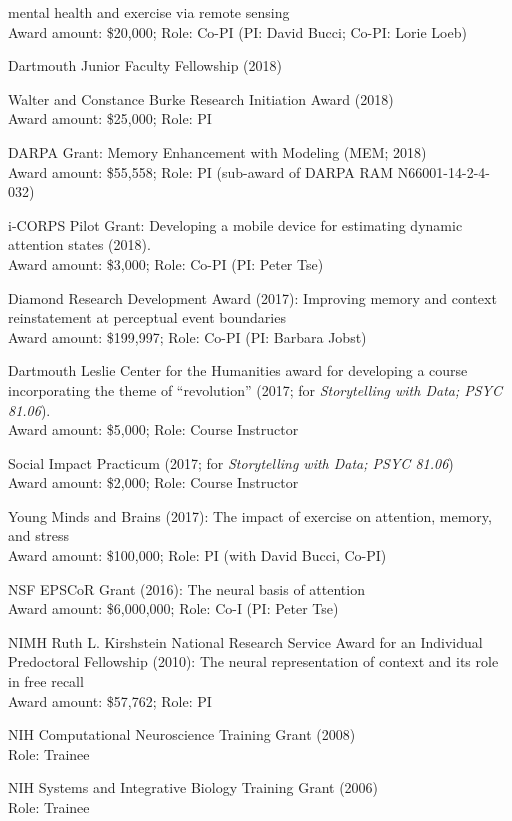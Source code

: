 \documentclass[11pt, a4paper]{article} %
\begin{document}
\begin{etaremune}
mental health and exercise via remote sensing\\
Award amount: \$20,000; Role: Co-PI (PI: David Bucci; Co-PI: Lorie
Loeb)
\item Dartmouth Junior Faculty Fellowship (2018)
\item Walter and Constance Burke Research Initiation Award (2018)\\
Award amount: \$25,000; Role: PI
\item DARPA Grant: Memory Enhancement with Modeling (MEM; 2018)\\
Award amount: \$55,558; Role: PI (sub-award of DARPA RAM
N66001-14-2-4-032)
\item i-CORPS Pilot Grant: Developing a mobile device for estimating
dynamic attention states (2018).\\Award amount: \$3,000; Role: Co-PI (PI: Peter Tse)
\item Diamond Research Development Award (2017): Improving memory and context reinstatement at perceptual event boundaries\\
Award amount: \$199,997; Role: Co-PI (PI: Barbara Jobst)
\item Dartmouth Leslie Center for the Humanities award for developing a
course incorporating the theme of ``revolution'' (2017; for
\textit{Storytelling with Data; PSYC 81.06}).\\Award amount: \$5,000;
Role: Course Instructor
\item Social Impact Practicum (2017; for \textit{Storytelling with Data; PSYC
  81.06})\\Award amount: \$2,000; Role: Course Instructor
\item Young Minds and Brains (2017): The impact of exercise on attention, memory,
and stress\\
Award amount: \$100,000; Role: PI (with David Bucci, Co-PI)
\item NSF EPSCoR Grant (2016): The neural basis of attention\\Award
amount: \$6,000,000; Role: Co-I (PI: Peter Tse)
\item NIMH Ruth L. Kirshstein National Research Service Award for an
  Individual Predoctoral Fellowship (2010): The neural representation of
  context and its role in free recall\\Award amount: \$57,762; Role:
  PI
\item NIH Computational Neuroscience Training Grant (2008)\\
Role: Trainee
\item NIH Systems and Integrative Biology Training
Grant (2006)\\Role: Trainee
\end{etaremune}
\end{document}

